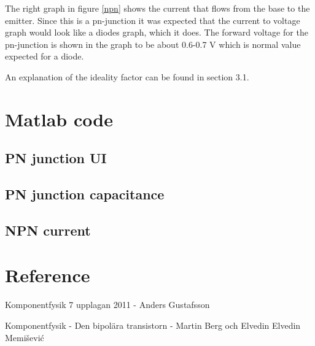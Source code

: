 \documentclass[a4paper]{article}
\begin{document}
The right graph in figure \ref{npn} shows the current that flows from the base to the emitter. Since this is a pn-junction it was expected that the current to voltage graph would look like a diodes graph, which it does. The forward voltage for the pn-junction is shown in the graph to be about 0.6-0.7 V which is normal value expected for a diode.

An explanation of the ideality factor can be found in section 3.1.

\newpage
\appendix
\section{Matlab code}
\subsection{PN junction UI}

\subsection{PN junction capacitance}

\subsection{NPN current}


\newpage
\section{Reference}
Komponentfysik  7 upplagan 2011 - Anders Gustafsson

Komponentfysik - Den bipolära transistorn - Martin Berg och Elvedin Elvedin Memišević
\end{document}
